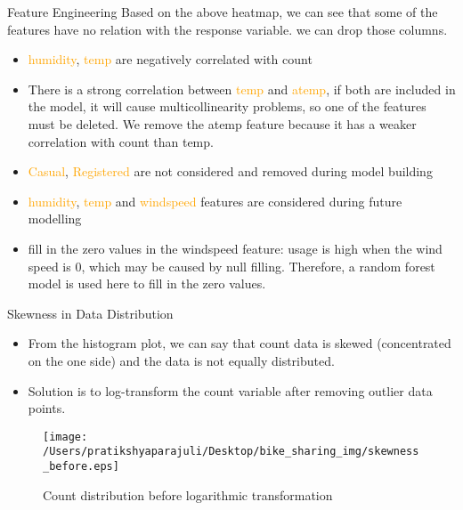 \documentclass[
 size=14pt,
 paper=smartboard,  %
 mode=present, 		%
 display=slides, 	%
 style=tuliplab,  	%
 pauseslide,
 fleqn,leqno]{powerdot}
\begin{document}
\begin{slide}[toc=,bm=]{Feature Engineering}
Based on the above heatmap, we can see that some of the features have no relation with the response variable. we can drop those columns.
\begin{itemize}
\item
\textcolor{orange} {humidity}, \textcolor{orange}{temp} are negatively correlated with count
\item
There is a strong correlation between \textcolor{orange} {temp} and \textcolor{orange} {atemp}, if both are included in the model, it will cause multicollinearity problems, so one of the features must be deleted. We remove the atemp feature because it has a weaker correlation with count than temp.
\item
\textcolor{orange} {Casual}, \textcolor{orange}{Registered} are not considered and removed during model building 
\item
\textcolor{orange} {humidity}, \textcolor{orange}{temp} and \textcolor{orange} {windspeed} features are considered during future modelling
\item 
fill in the zero values in the windspeed feature: usage is high when the wind speed is 0, which may be caused by null filling. Therefore, a random forest model is used here to fill in the zero values. 
\end{itemize}


\end{slide}




\begin{slide}[toc=,bm=]{ Skewness in Data Distribution}

  \begin{itemize}
  \item From the histogram plot, we can say that count data is skewed (concentrated on the one side) and the data is not equally distributed.
  \item Solution is to log-transform the count variable after removing outlier data points.
  \end{itemize}
  \begin{figure}
    \centering
    \centerline{\texttt{[image: /Users/pratikshyaparajuli/Desktop/bike\_sharing\_img/skewness\_before.eps]}}
    \caption{Count distribution before logarithmic transformation}\label{fig:Count distribution before logarithmic transformation}
  \end{figure}
  \end{slide}
\end{document}
